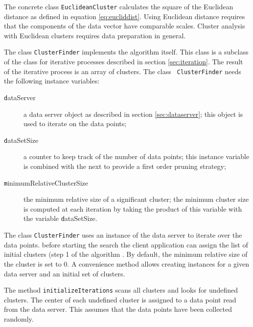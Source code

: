 {

The concrete class \texttt{EuclideanCluster} calculates the square of
the Euclidean distance as defined in equation \ref{eq:eucliddist}.
Using Euclidean distance requires that the components of the data
vector have comparable scales. Cluster analysis with Euclidean
clusters requires data preparation in general.

The class \texttt{ClusterFinder} implements the algorithm itself.
This class is a subclass of the class for iterative processes
described in section \ref{sec:iteration}. The result of the
iterative process is an array of clusters. The class \texttt{
ClusterFinder} needs the following instance variables:
\begin{description}
  \item[\texttt dataServer] a data server object as described in
  section \ref{sec:dataserver}; this object is used to iterate on
  the data points;
  \item[\texttt dataSetSize] a counter to keep track of the number of
  data points; this instance variable is combined with the next to
  provide a first order pruning strategy;
  \item[\texttt minimumRelativeClusterSize] the minimum relative size
  of a significant cluster; the minimum cluster
  size is computed at each iteration by taking the product of this variable with the
  variable {\texttt dataSetSize}.
\end{description}

The class \texttt{ClusterFinder} uses an instance of the data server
to iterate over the data points. before starting the search the
client application can assign the list of initial clusters (step 1
of the algorithm . By default, the minimum relative size of the
cluster is set to 0. A convenience method allows creating
instances for a given data server and an initial set of clusters.

The method \texttt{initializeIterations} scans all clusters and looks
for undefined clusters. The center of each undefined cluster is
assigned to a data point read from the data server. This assumes
that the data points have been collected randomly.

}
